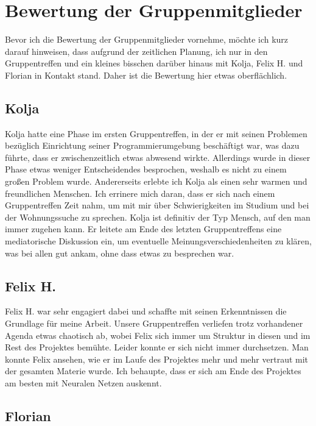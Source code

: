 \documentclass{article}
\begin{document}
\section{Bewertung der Gruppenmitglieder}

Bevor ich die Bewertung der Gruppenmitglieder vornehme, möchte ich kurz darauf hinweisen, dass aufgrund der zeitlichen Planung, ich nur in den Gruppentreffen und ein kleines bisschen darüber hinaus
mit Kolja, Felix H. und Florian in Kontakt stand. Daher ist die Bewertung hier etwas oberflächlich.

\subsection{Kolja}

Kolja hatte eine Phase im ersten Gruppentreffen, in der er mit seinen Problemen bezüglich Einrichtung seiner Programmierumgebung
beschäftigt war, was dazu führte, dass er zwischenzeitlich etwas abwesend wirkte. Allerdings wurde in dieser Phase etwas weniger Entscheidendes
besprochen, weshalb es nicht zu einem großen Problem wurde. Andererseits erlebte ich Kolja als einen sehr warmen und freundlichen Menschen. 
Ich errinere mich daran, dass er sich nach einem Gruppentreffen Zeit nahm, um mit mir über Schwierigkeiten im Studium und bei der Wohnungssuche 
zu sprechen. Kolja ist definitiv der Typ Mensch, auf den man immer zugehen kann. Er leitete am Ende des letzten Gruppentreffens eine 
mediatorische Diskussion ein, um eventuelle Meinungsverschiedenheiten zu klären, was bei allen gut ankam, ohne dass etwas zu besprechen war.

\subsection{Felix H.}

Felix H. war sehr engagiert dabei und schaffte mit seinen Erkenntnissen die Grundlage für meine Arbeit. Unsere Gruppentreffen verliefen trotz 
vorhandener Agenda etwas chaotisch ab, wobei Felix sich immer um Struktur in diesen und im Rest des Projektes bemühte. Leider konnte er sich nicht immer durchsetzen.
Man konnte Felix ansehen, wie er im Laufe des Projektes mehr und mehr vertraut mit der gesamten Materie wurde. Ich behaupte, 
dass er sich am Ende des Projektes am besten mit Neuralen Netzen auskennt. 

\subsection{Florian}
\end{document}
